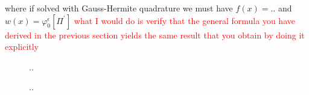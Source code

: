 \documentclass[12pt]{article}
\numberwithin{equation}{section}
\begin{document}
  where if solved with Gauss-Hermite quadrature we must have 
  $f(x)=..$ and $w(x) = \varphi^\epsilon_0[\Pi^\prime]$
  \textcolor{red}{what I would do is verify that the general 
  formula you have derived in the previous section yields the same 
  result that you obtain by doing it explicitly}
  \begin{figure}[h!]
    \centering
    \scalebox{0.9}{
    
    }
    \caption{..}
    \label{figure}
  \end{figure}
  \begin{figure}[h!]
    \centering
    \scalebox{0.9}{
    
    }
    \caption{..}
    \label{figure}
  \end{figure}
  
\end{document}
